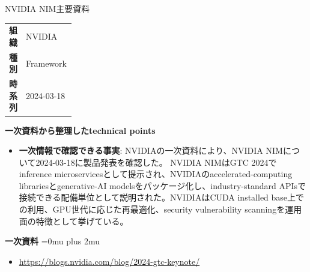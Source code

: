 \begin{technicalnote}{NVIDIA NIM}{主要資料}
\begingroup
\begin{tabularx}{\linewidth}{@{}>{\bfseries}p{0.22\linewidth}X@{}}
組織 & NVIDIA \\
種別 & Framework \\
時系列 & 2024-03-18 \\
\end{tabularx}
\smallskip
\begin{minipage}{\linewidth}
{\bfseries 一次資料から整理したtechnical points}
\begin{itemize}[leftmargin=1.5em,itemsep=0.35em]
\item \textbf{一次情報で確認できる事実}: NVIDIAの一次資料により、NVIDIA NIMについて2024-03-18に製品発表を確認した。 NVIDIA NIMはGTC 2024でinference microservicesとして提示され、NVIDIAのaccelerated-computing librariesとgenerative-AI modelsをパッケージ化し、industry-standard APIsで接続できる配備単位として説明された。NVIDIAはCUDA installed base上での利用、GPU世代に応じた再最適化、security vulnerability scanningを運用面の特徴として挙げている。
\end{itemize}
\begin{minipage}{\linewidth}
\begin{samepage}
{\bfseries 一次資料}
\begingroup\sloppy
\Urlmuskip=0mu plus 2mu\relax
\begin{itemize}[leftmargin=1.5em,itemsep=0.25em]
\item {\scriptsize\url{https://blogs.nvidia.com/blog/2024-gtc-keynote/}}
\end{itemize}
\endgroup
\end{samepage}
\end{minipage}
\end{minipage}
\endgroup
\end{technicalnote}
\medskip

